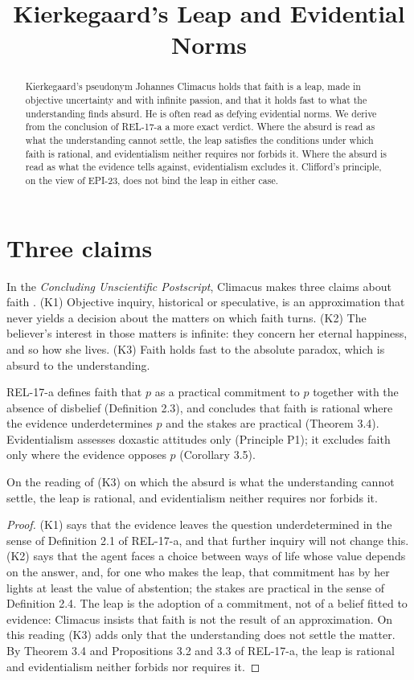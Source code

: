 \documentclass{situationist-preprint}
\title{Kierkegaard's Leap and Evidential Norms}
\begin{document}
\maketitle

\begin{abstract}
Kierkegaard's pseudonym Johannes Climacus holds that faith is a leap, made in objective uncertainty and with infinite passion, and that it holds fast to what the understanding finds absurd. He is often read as defying evidential norms. We derive from the conclusion of REL-17-a a more exact verdict. Where the absurd is read as what the understanding cannot settle, the leap satisfies the conditions under which faith is rational, and evidentialism neither requires nor forbids it. Where the absurd is read as what the evidence tells against, evidentialism excludes it. Clifford's principle, on the view of EPI-23, does not bind the leap in either case.
\end{abstract}

\section{Three claims}

In the \emph{Concluding Unscientific Postscript}, Climacus makes three claims about faith \citep{Kierkegaard1846}. (K1) Objective inquiry, historical or speculative, is an approximation that never yields a decision about the matters on which faith turns. (K2) The believer's interest in those matters is infinite: they concern her eternal happiness, and so how she lives. (K3) Faith holds fast to the absolute paradox, which is absurd to the understanding.

REL-17-a defines faith that $p$ as a practical commitment to $p$ together with the absence of disbelief (Definition 2.3), and concludes that faith is rational where the evidence underdetermines $p$ and the stakes are practical (Theorem 3.4). Evidentialism assesses doxastic attitudes only (Principle P1); it excludes faith only where the evidence opposes $p$ (Corollary 3.5).

\begin{proposition}\label{p:leap}
On the reading of (K3) on which the absurd is what the understanding cannot settle, the leap is rational, and evidentialism neither requires nor forbids it.
\end{proposition}

\begin{proof}
(K1) says that the evidence leaves the question underdetermined in the sense of Definition 2.1 of REL-17-a, and that further inquiry will not change this. (K2) says that the agent faces a choice between ways of life whose value depends on the answer, and, for one who makes the leap, that commitment has by her lights at least the value of abstention; the stakes are practical in the sense of Definition 2.4. The leap is the adoption of a commitment, not of a belief fitted to evidence: Climacus insists that faith is not the result of an approximation. On this reading (K3) adds only that the understanding does not settle the matter. By Theorem 3.4 and Propositions 3.2 and 3.3 of REL-17-a, the leap is rational and evidentialism neither forbids nor requires it.
\end{proof}
\end{document}
